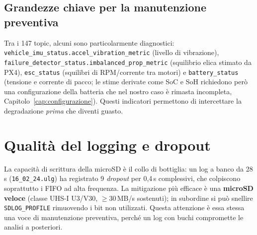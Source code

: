 \subsection{Grandezze chiave per la manutenzione preventiva}

Tra i 147 topic, alcuni sono particolarmente diagnostici:
\texttt{vehicle\_imu\_status.accel\_vibration\_metric} (livello di vibrazione),
\texttt{failure\_detector\_status.imbalanced\_prop\_metric} (squilibrio elica
stimato da PX4), \texttt{esc\_status} (squilibri di RPM/corrente tra motori) e
\texttt{battery\_status} (tensione e corrente di pacco; le stime derivate come SoC
e SoH richiedono per\`o una configurazione della batteria che nel nostro caso \`e
rimasta incompleta, Capitolo~\ref{cap:configurazione}). Questi indicatori
permettono di intercettare la degradazione \emph{prima} che diventi guasto.

\section{Qualit\`a del logging e dropout}

La capacit\`a di scrittura della microSD \`e il collo di bottiglia: un log a
banco da 28\,s (\texttt{16\_02\_24.ulg}) ha registrato 9 \emph{dropout} per
0{,}4\,s complessivi, che colpiscono soprattutto i FIFO ad alta frequenza. La
mitigazione pi\`u efficace \`e una \textbf{microSD veloce} (classe UHS-I U3/V30,
$\geq$30\,MB/s sostenuti); in subordine si pu\`o snellire
\texttt{SDLOG\_PROFILE} rimuovendo i bit non utilizzati. Questa attenzione \`e
essa stessa una voce di manutenzione preventiva, perch\'e un log con buchi
compromette le analisi a posteriori.
